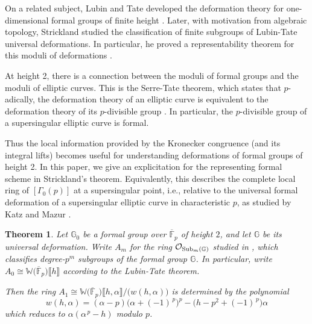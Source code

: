 \documentclass{gtpart}
\newtheorem{thm}[equation]{Theorem}
\theoremstyle{definition}
\theoremstyle{remark}
\newcommand{\mb}[1]{\mathbb{#1}}
\newcommand{\cF}{\overline {\mb F}}
\newcommand{\CO}{{\cal O}}
\newcommand{\BG}{{\mb G}}
\newcommand{\BW}{{\mb W}}
\newcommand{\Sub}{{\rm Sub}}
\newcommand{\A}{\alpha}
\newcommand{\G}{\Gamma}
\newcommand{\lb}{\llbracket}
\newcommand{\rb}{\rrbracket}
\renewcommand{\=}{\approx}
\renewcommand{\-}{\sim}
\numberwithin{equation}{section}
\begin{document}
On a related subject, Lubin and Tate developed the deformation theory for 
one-dimensional formal groups of finite height \cite{LubinTate}.  Later, with 
motivation from algebraic topology, Strickland studied the classification of 
finite subgroups of Lubin-Tate universal deformations.  In particular, he proved 
a representability theorem for this moduli of deformations 
\cite[Theorem 42]{Str97}.  

At height 2, there is a connection between the moduli of formal groups and the 
moduli of elliptic curves.  This is the Serre-Tate theorem, which states that 
$p$-adically, the deformation theory of an elliptic curve is equivalent to the 
deformation theory of its $p$-divisible group \cite[Section 6]{LST}.  In 
particular, the $p$-divisible group of a supersingular elliptic curve is formal.  

Thus the local information provided by the Kronecker congruence (and its 
integral lifts) becomes useful for understanding deformations of formal groups 
of height 2.  In this paper, we give an explicitation for the representing 
formal scheme in Strickland's theorem.  Equivalently, this describes the 
complete local ring of $[\G_0(p)]$ at a supersingular point, i.e., relative to 
the universal formal deformation of a supersingular elliptic curve in 
characteristic $p$, as studied by Katz and Mazur \cite{KM}.  

\begin{thm}
 \label{thm:me}
 Let $\BG_0$ be a formal group over $\cF_p$ of height $2$, and let $\BG$ be its 
 universal deformation.  Write $A_m$ for the ring $\CO_{\Sub_m(\BG)}$ studied in 
 \cite{Str97}, which classifies degree-$p^m$ subgroups of the formal group 
 $\BG$.  In particular, write $A_0 \cong \BW\big(\cF_p\big)\lb h \rb$ according 
 to the Lubin-Tate theorem.  

 Then the ring $A_1 \cong \BW\big(\cF_p\big)\lb h, \A \rb / \big(w(h,\A)\big)$ 
 is determined by the polynomial 
 \begin{equation}
  \label{me}
  w(h,\A) = (\A - p) \big(\A + (-1)^{\,p}\big)^p 
            - \big(h - p^2 + (-1)^{\,p}\big) \A 
 \end{equation}
 which reduces to $\A (\A^{\,p} - h)$ modulo $p$.  
\end{thm}
\end{document}
